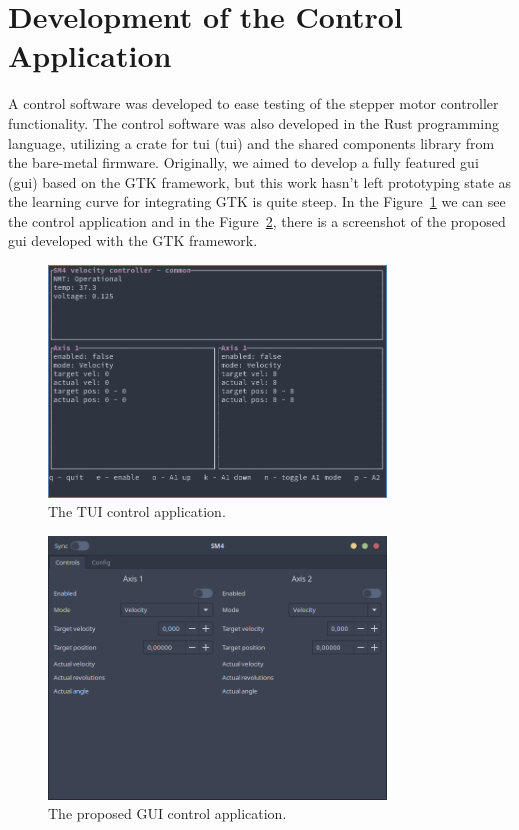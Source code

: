 \section{Development of the Control Application}
\label{sec:control_sw}
A control software was developed to ease testing of the stepper motor controller functionality.
The control software was also developed in the Rust programming language, utilizing a crate for \acs{tui} (\acl{tui}) and the shared components library from the bare-metal firmware.
Originally, we aimed to develop a fully featured \acs{gui} (\acl{gui}) based on the GTK framework, but this work hasn't left prototyping state as the learning curve for integrating GTK is quite steep.
In the Figure~\ref{fig:tui} we can see the control application and in the Figure~\ref{fig:gui}, there is a screenshot of the proposed \acs{gui} developed with the GTK framework.

\begin{figure}[H]
    \centering
    \includegraphics[width=0.8\textwidth]{obrazky/tui}
    \caption{The TUI control application.}
    \label{fig:tui}
\end{figure}

\begin{figure}[H]
    \centering
    \includegraphics[width=0.8\textwidth]{obrazky/gui}
    \caption{The proposed GUI control application.}
    \label{fig:gui}
\end{figure}



